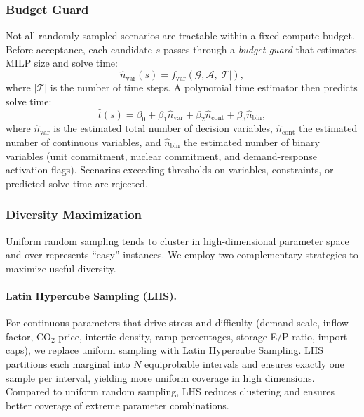 \documentclass{article}
\begin{document}
\subsubsection{Budget Guard}
\label{sec:budget_guard}

Not all randomly sampled scenarios are tractable within a fixed compute budget. Before acceptance, each candidate $s$ passes through a \emph{budget guard} that estimates MILP size and solve time:
\begin{equation}
\widehat{n}_{\mathrm{var}}(s) = f_{\mathrm{var}}(\mathcal{G}, \mathcal{A}, |\mathcal{T}|),
\end{equation}
where $|\mathcal{T}|$ is the number of time steps. A polynomial time estimator then predicts solve time:
\begin{equation}
\widehat{t}(s) = \beta_0 + \beta_1 \widehat{n}_{\mathrm{var}} + \beta_2 \widehat{n}_{\mathrm{cont}} + \beta_3 \widehat{n}_{\mathrm{bin}},
\end{equation}
where $\widehat{n}_{\mathrm{var}}$ is the estimated total number of decision variables,
$\widehat{n}_{\mathrm{cont}}$ the estimated number of continuous variables,
and $\widehat{n}_{\mathrm{bin}}$ the estimated number of binary variables
(unit commitment, nuclear commitment, and demand-response activation flags). Scenarios exceeding thresholds on variables, constraints, or predicted solve time are rejected.

\subsubsection{Diversity Maximization}
\label{sec:diversity}

Uniform random sampling tends to cluster in high-dimensional parameter space and over-represents ``easy'' instances. We employ two complementary strategies to maximize useful diversity.

\paragraph{Latin Hypercube Sampling (LHS).}
For continuous parameters that drive stress and difficulty (demand scale, inflow factor, CO$_2$ price, intertie density, ramp percentages, storage E/P ratio, import caps), we replace uniform sampling with Latin Hypercube Sampling. LHS partitions each marginal into $N$ equiprobable intervals and ensures exactly one sample per interval, yielding more uniform coverage in high dimensions. Compared to uniform random sampling, LHS reduces clustering and ensures better coverage of extreme parameter combinations.
\end{document}
